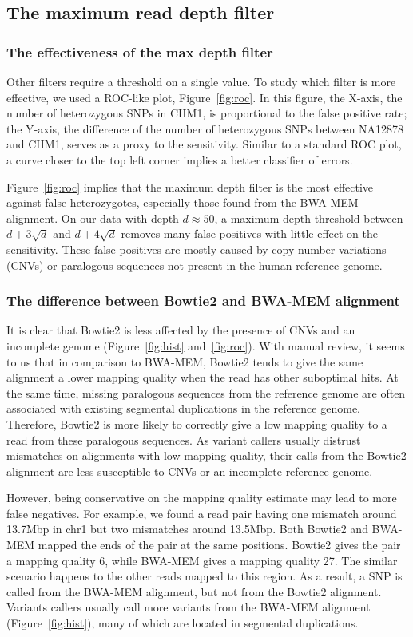 \documentclass{bioinfo}
\begin{document}
\subsection{The maximum read depth filter}

\subsubsection{The effectiveness of the max depth filter}
Other filters require a threshold on a single value. To study
which filter is more effective, we used a ROC-like plot,
Figure~\ref{fig:roc}. In this figure, the X-axis, the number of heterozygous
SNPs in CHM1, is proportional to the false positive rate; the Y-axis, the
difference of the number of heterozygous SNPs between NA12878 and CHM1, serves
as a proxy to the sensitivity. Similar to a standard ROC plot, a curve closer
to the top left corner implies a better classifier of errors.

Figure~\ref{fig:roc} implies that the maximum depth filter is the most
effective against false heterozygotes, especially those found from the BWA-MEM
alignment. On our data with depth $d\approx50$, a maximum depth threshold
between $d+3\sqrt{d}$ and $d+4\sqrt{d}$ removes many false positives with
little effect on the sensitivity. These false positives are mostly caused by
copy number variations (CNVs) or paralogous sequences not present in the human
reference genome.

\subsubsection{The difference between Bowtie2 and BWA-MEM alignment}
It is clear that Bowtie2 is less affected by the presence of CNVs and an
incomplete genome (Figure~\ref{fig:hist} and~\ref{fig:roc}). With manual
review, it seems to us that in comparison to BWA-MEM, Bowtie2 tends to give the
same alignment a lower mapping quality when the read has other suboptimal hits.
At the same time, missing paralogous sequences from the reference genome are
often associated with existing segmental duplications in the reference genome.
Therefore, Bowtie2 is more likely to correctly give a low mapping quality to a
read from these paralogous sequences. As variant callers usually distrust
mismatches on alignments with low mapping quality, their calls from the Bowtie2
alignment are less susceptible to CNVs or an incomplete reference genome.

However, being conservative on the mapping quality estimate may lead to more false
negatives. For example, we found a read pair having one mismatch around
13.7Mbp in chr1 but two mismatches around 13.5Mbp. Both Bowtie2 and BWA-MEM
mapped the ends of the pair at the same positions. Bowtie2 gives the pair a
mapping quality 6, while BWA-MEM gives a mapping quality 27. The similar
scenario happens to the other reads mapped to this region. As a result, a SNP
is called from the BWA-MEM alignment, but not from the Bowtie2 alignment.
Variants callers usually call more variants from the BWA-MEM alignment
(Figure~\ref{fig:hist}), many of which are located in segmental duplications.
\end{document}
